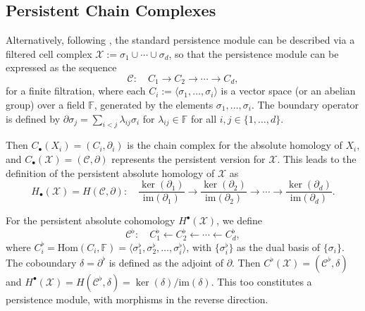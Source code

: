 \subsection{Persistent Chain Complexes}
Alternatively, following \cite[§2.6]{de2011dualities}, the standard persistence module
can be described via a filtered cell complex $\mathcal{X}:= \sigma_{1} \cup \cdots
\cup \sigma_{d}$, so that the persistence module can be expressed as the
sequence
\[
	\mathcal{C}: \quad C_{1} \to C_{2} \to \cdots \to C_{d},
\]
for a finite filtration, where each $C_{i} := \langle \sigma_{1}, \ldots, \sigma_{i}
\rangle$ is a vector space (or an abelian group) over a field $\mathbb{F}$,
generated by the elements $\sigma_{1}, \ldots, \sigma_{i}$. The boundary operator
is defined by $\partial \sigma_{j} = \sum_{i<j}\lambda_{ij}\sigma_{i}$ for $\lambda
_{ij}\in \mathbb{F}$ for all $i, j \in \{1, \ldots, d\}$.

Then $C_{\bullet}(X_{i}) = (C_{i},\partial_{i})$ is the chain complex for the absolute
homology of $X_{i}$, and $C_{\bullet}(\mathcal{X}) = (\mathcal{C},\partial)$
represents the persistent version for $\mathcal{X}$. This leads to the definition
of the persistent absolute homology of $\mathcal{X}$ as
\[
	H_{\bullet}(\mathcal{X}) = H(\mathcal{C}, \partial): \quad \frac{\ker(\partial_{1})}{\text{im}(\partial_{1})}
	\to \frac{\ker(\partial_{2})}{\text{im}(\partial_{2})}\to \cdots \to \frac{\ker(\partial_{d})}{\text{im}(\partial_{d})}
	.
\]

For the persistent absolute cohomology $H^{\bullet}(\mathcal{X})$, we define
\[
	\mathcal{C}^{\flat}: \quad C^{\flat}_{1} \leftarrow C^{\flat}_{2} \leftarrow \cdots
	\leftarrow C^{\flat}_{d},
\]
where $C_{i}^{\flat} = \text{Hom}(C_{i}, \mathbb{F}) = \langle \sigma_{1}^{\flat}
, \sigma_{2}^{\flat}, \ldots, \sigma_{i}^{\flat} \rangle$, with
$\{\sigma_{i}^{\flat}\}$ as the dual basis of $\{\sigma_{i}\}$. The coboundary $\delta
= \partial^{\flat}$ is defined as the adjoint of $\partial$. Then
$C^{\flat}(\mathcal{X}) = (\mathcal{C}^{\flat}, \delta)$ and
$H^{\bullet}(\mathcal{X}) = H(\mathcal{C}^{\flat}, \delta) = \ker(\delta) / \text{im}
(\delta)$. This too constitutes a persistence module, with morphisms in the
reverse direction.

